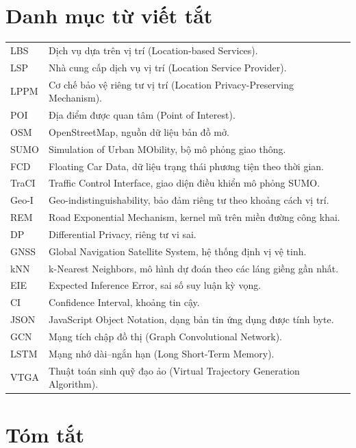 \documentclass[12pt,a4paper,oneside]{report}
\begin{document}
\chapter*{Danh mục từ viết tắt}
\begin{tabular}{P{2.6cm}P{11.8cm}}
LBS & Dịch vụ dựa trên vị trí (Location-based Services).\\
LSP & Nhà cung cấp dịch vụ vị trí (Location Service Provider).\\
LPPM & Cơ chế bảo vệ riêng tư vị trí (Location Privacy-Preserving Mechanism).\\
POI & Địa điểm được quan tâm (Point of Interest).\\
OSM & OpenStreetMap, nguồn dữ liệu bản đồ mở.\\
SUMO & Simulation of Urban MObility, bộ mô phỏng giao thông.\\
FCD & Floating Car Data, dữ liệu trạng thái phương tiện theo thời gian.\\
TraCI & Traffic Control Interface, giao diện điều khiển mô phỏng SUMO.\\
Geo-I & Geo-indistinguishability, bảo đảm riêng tư theo khoảng cách vị trí.\\
REM & Road Exponential Mechanism, kernel mũ trên miền đường công khai.\\
DP & Differential Privacy, riêng tư vi sai.\\
GNSS & Global Navigation Satellite System, hệ thống định vị vệ tinh.\\
kNN & k-Nearest Neighbors, mô hình dự đoán theo các láng giềng gần nhất.\\
EIE & Expected Inference Error, sai số suy luận kỳ vọng.\\
CI & Confidence Interval, khoảng tin cậy.\\
JSON & JavaScript Object Notation, dạng bản tin ứng dụng được tính byte.\\
GCN & Mạng tích chập đồ thị (Graph Convolutional Network).\\
LSTM & Mạng nhớ dài--ngắn hạn (Long Short-Term Memory).\\
VTGA & Thuật toán sinh quỹ đạo ảo (Virtual Trajectory Generation Algorithm).\\
\end{tabular}

\cleardoublepage
{}
\chapter*{Tóm tắt}
\end{document}
